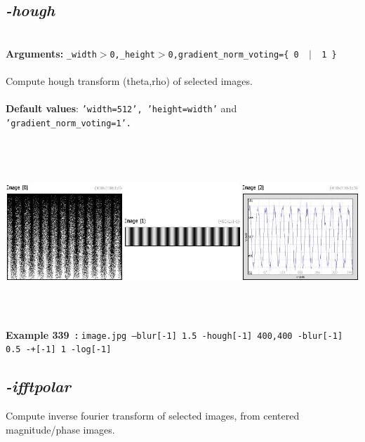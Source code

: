 \documentclass[a4paper,11pt,twoside]{book}
\begin{document}
\subsection{\emph{-hough} }\vspace*{-0.5em}
~\\\textbf{Arguments: } 
{\small \texttt{\_width$>$0,\_height$>$0,gradient\_norm\_voting=\{ 0 ~$|$~ 1 \}}}\\~\\
Compute hough transform (theta,rho) of selected images.
~\\~\\\textbf{Default values}: {\small \texttt{'width=512', 'height=width'} and \texttt{'gradient\_norm\_voting=1'.}}
\begin{center}\includegraphics[keepaspectratio=true,height=7cm,width=\textwidth]{img/gmic_def339.jpg}\\
{\footnotesize \textbf{Example 339~:} \texttt{image.jpg --blur[-1] 1.5 -hough[-1] 400,400 -blur[-1] 0.5 -+[-1] 1 -log[-1]}}
\end{center}

\subsection{\emph{-ifftpolar} }\vspace*{-0.5em}
Compute inverse fourier transform of selected images, from centered magnitude/phase images.
\end{document}
